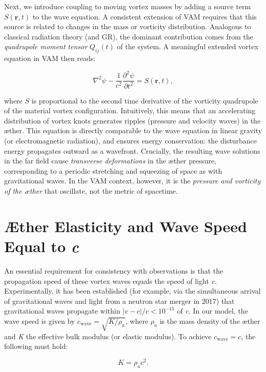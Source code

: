 Next, we introduce coupling to moving vortex masses by adding a source term $S(\mathbf{r},t)$ to the wave equation. A consistent extension of VAM requires that this source is related to changes in the mass or vorticity distribution. Analogous to classical radiation theory (and GR), the dominant contribution comes from the \textit{quadrupole moment tensor} $Q_{ij}(t)$ of the system. A meaningful extended vortex equation in VAM then reads:

\[
\nabla^2 \psi - \frac{1}{c^2} \frac{\partial^2 \psi}{\partial t^2} = S(\mathbf{r},t),
\]

where $S$ is proportional to the second time derivative of the vorticity quadrupole of the material vortex configuration. Intuitively, this means that an accelerating distribution of vortex knots generates ripples (pressure and velocity waves) in the æther. This equation is directly comparable to the wave equation in linear gravity (or electromagnetic radiation), and ensures energy conservation: the disturbance energy propagates outward as a wavefront. Crucially, the resulting wave solutions in the far field cause \textit{transverse deformations} in the æther pressure, corresponding to a periodic stretching and squeezing of space as with gravitational waves. In the VAM context, however, it is the \textit{pressure and vorticity of the æther} that oscillate, not the metric of spacetime.

\section*{Æther Elasticity and Wave Speed Equal to \textit{c}}
An essential requirement for consistency with observations is that the propagation speed of these vortex waves equals the speed of light \textit{c}. Experimentally, it has been established (for example, via the simultaneous arrival of gravitational waves and light from a neutron star merger in 2017) that gravitational waves propagate within $|v-c|/c < 10^{-15}$ of \textit{c}. In our model, the wave speed is given by $c_{\text{wave}} = \sqrt{K/\rho_a}$, where $ρ_a$ is the mass density of the æther and \textit{K} the effective bulk modulus (or elastic modulus). To achieve $c_{\text{wave}} = c$, the following must hold:

\[
K = \rho_a c^2.
\]

